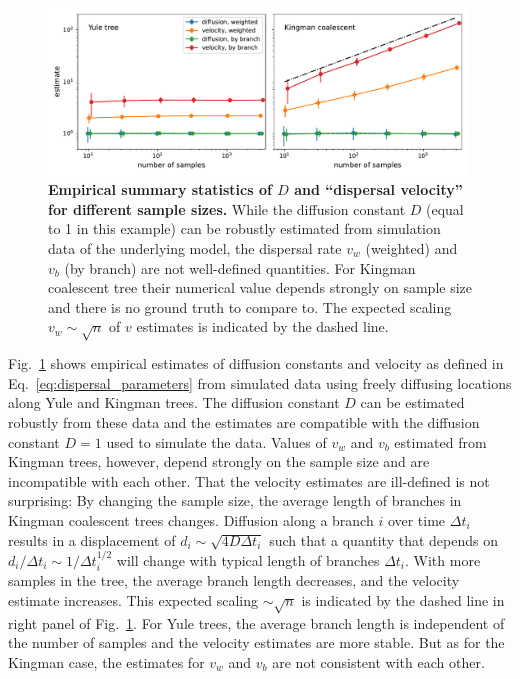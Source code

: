 \documentclass[aps,rmp, twocolumn]{revtex4}
\begin{document}
\begin{figure}[tb]
    \includegraphics*[width=0.99\textwidth]{figures/Fig2}
    \caption{\label{fig:D_and_v}{\bf Empirical summary statistics of $D$ and ``dispersal velocity'' for different sample sizes.}
    While the diffusion constant $D$ (equal to 1 in this example) can be robustly estimated from simulation data of the underlying model, the dispersal rate $v_w$ (weighted) and $v_b$ (by branch) are not well-defined quantities. For Kingman coalescent tree their numerical value depends strongly on sample size and there is no ground truth to compare to. The expected scaling $v_w \sim \sqrt{n}$ of $v$ estimates is indicated by the dashed line.}
\end{figure}

Fig.~\ref{fig:D_and_v} shows empirical estimates of diffusion constants and velocity as defined in Eq.~\ref{eq:dispersal_parameters} from simulated data using freely diffusing locations along Yule and Kingman trees.
The diffusion constant $D$ can be estimated robustly from these data and the estimates are compatible with the diffusion constant $D=1$ used to simulate the data.
Values of $v_w$ and $v_b$ estimated from Kingman trees, however, depend strongly on the sample size and are incompatible with each other.
That the velocity estimates are ill-defined is not surprising: By changing the sample size, the average length of branches in Kingman coalescent trees changes.
Diffusion along a branch $i$ over time $\Delta t_i$ results in a displacement of $d_i \sim \sqrt{4D\Delta t_i}$ such that a quantity that depends on $d_i / \Delta t_i \sim 1/\Delta t_i^{1/2}$ will change with typical length of branches $\Delta t_i$.
With more samples in the tree, the average branch length decreases, and the velocity estimate increases.
This expected scaling $\sim \sqrt{n}$ is indicated by the dashed line in right panel of Fig.~\ref{fig:D_and_v}.
For Yule trees, the average branch length is independent of the number of samples and the velocity estimates are more stable.
But as for the Kingman case, the estimates for $v_w$ and $v_b$ are not consistent with each other.
\end{document}
